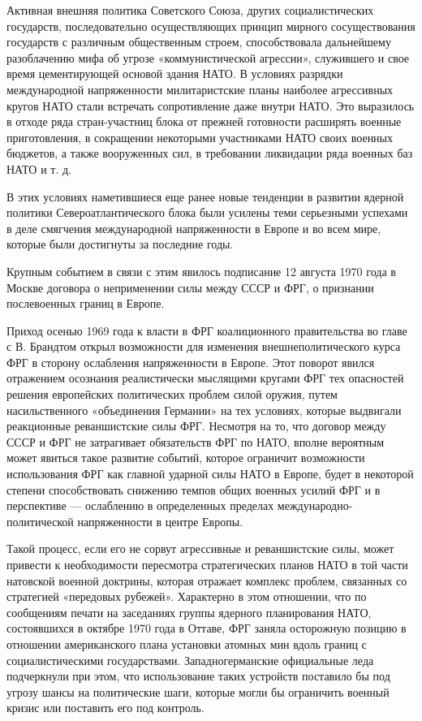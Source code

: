 \documentclass[12pt, a4paper, openany]{book}
\begin{document}
	Активная внешняя политика Советского Союза, других социалистических государств, последовательно осуществляющих принцип мирного сосуществования государств с различным общественным строем, способствовала дальнейшему разоблачению мифа об угрозе «коммунистической агрессии», служившего и свое время цементирующей основой здания НАТО. В условиях разрядки международной напряженности милитаристские планы наиболее агрессивных кругов НАТО стали встречать сопротивление даже внутри НАТО. Это выразилось в отходе ряда стран-участниц блока от прежней готовности расширять военные приготовления, в сокращении некоторыми участниками НАТО своих военных бюджетов, а также вооруженных сил, в требовании ликвидации ряда военных баз НАТО и т. д.
	
	В этих условиях наметившиеся еще ранее новые тенденции в развитии ядерной политики Североатлантического блока были усилены теми серьезными успехами в деле смягчения международной напряженности в Европе и во всем мире, которые были достигнуты за последние годы.
	
	Крупным событием в связи с этим явилось подписание 12 августа 1970 года в Москве договора о неприменении силы между СССР и ФРГ, о признании послевоенных границ в Европе.
	
	Приход осенью 1969 года к власти в ФРГ коалиционного правительства во главе с В. Брандтом открыл возможности для изменения внешнеполитического курса ФРГ в сторону ослабления напряженности в Европе. Этот поворот явился отражением осознания реалистически мыслящими кругами ФРГ тех опасностей решения европейских политических проблем силой оружия, путем насильственного «объединения Германии» на тех условиях, которые выдвигали реакционные реваншистские силы ФРГ. Несмотря на то, что договор между СССР и ФРГ не затрагивает обязательств ФРГ по НАТО, вполне вероятным может явиться такое развитие событий, которое ограничит возможности использования ФРГ как главной ударной силы НАТО в Европе, будет в некоторой степени способствовать снижению темпов общих военных усилий ФРГ и в перспективе — ослаблению в определенных пределах международно-политической напряженности в центре Европы.
	
	Такой процесс, если его не сорвут агрессивные и реваншистские силы, может привести к необходимости пересмотра стратегических планов НАТО в той части натовской военной доктрины, которая отражает комплекс проблем, связанных со стратегией «передовых рубежей». Характерно в этом отношении, что по сообщениям печати на заседаниях группы ядерного планирования НАТО, состоявшихся в октябре 1970 года в Оттаве, ФРГ заняла осторожную позицию в отношении американского плана установки атомных мин вдоль границ с социалистическими государствами. Западногерманские официальные леда подчеркнули при этом, что использование таких устройств поставило бы под угрозу шансы на политические шаги, которые могли бы ограничить военный кризис или поставить его под контроль.
	
\end{document}
